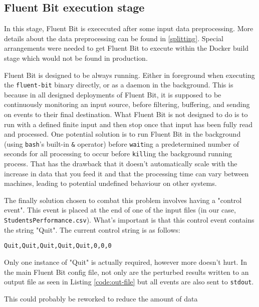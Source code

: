 \subsection{Fluent Bit execution stage}
In this stage, Fluent Bit is exececuted after some input data preprocessing. More details about the data preprocessing can be found in \ref{splitting}. Special arrangements were needed to get Fluent Bit to execute within the Docker build stage which would not be found in production.

Fluent Bit is designed to be always running. Either in foreground when executing the \texttt{fluent-bit} binary directly, or as a \Gls{daemon} in the background. This is because in all designed deployments of Fluent Bit, it is supposed to be continuously monitoring an input source, before filtering, buffering, and sending on \glspl{event} to their final destination. What Fluent Bit is not designed to do is to run with a defined finite input and then stop once that input has been fully read and processed. One potential solution is to run Fluent Bit in the background (using \texttt{bash}'s built-in \texttt{\&} operator) before \texttt{wait}ing a predetermined number of seconds for all processing to occur before \texttt{kill}ing the background running process. That has the drawback that it doesn't automatically scale with the increase in data that you feed it and that the processing time can vary between machines, leading to potential undefined behaviour on other systems. 

The finally solution chosen to combat this problem involves having a "control event". This event is placed at the end of one of the input files (in our case, \texttt{StudentsPerformance.csv}). What's important is that this control event contains the string "Quit". The current control string is as follows:

\begin{lstlisting}[caption={Quit Control code line}]
Quit,Quit,Quit,Quit,Quit,0,0,0
\end{lstlisting}

Only one instance of "Quit" is actually required, however more doesn't hurt. In the main Fluent Bit config file, not only are the perturbed results written to an output file as seen in Listing \ref{code:out-file} but all events are also sent to \texttt{stdout}.

This could probably be reworked to reduce the amount of data 


